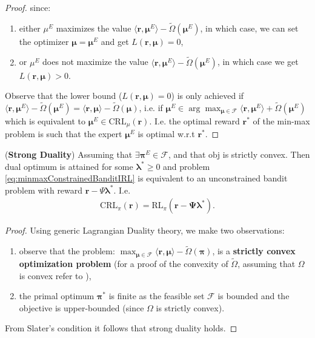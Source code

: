 \begin{proof}
    since:
    \begin{enumerate}
        \item either $\mu^E$ maximizes the value $\langle \bm{r}, \bm{\mu}^E \rangle - \tilde{\Omega}(\bm{\mu}^E)$, in which case, we can set the optimizer $\bm{\mu} = \bm{\mu}^E$ and get $ L(\bm{r},\bm{\mu})=0$,
        \item or  $\mu^E$ does not maximize the value $\langle \bm{r}, \bm{\mu}^E\rangle - \tilde{\Omega}(\bm{\mu}^E)$, in  which case we get $ L(\bm{r},\bm{\mu})>0$.
    \end{enumerate}
    Observe that the lower bound ($ L(\bm{r},\bm{\mu})=0$) is only achieved if $\langle \bm{r}, \bm{\mu}^E\rangle - \tilde{\Omega}(\bm{\mu}^E)= \langle \bm{r}, \bm{\mu} \rangle - \tilde{\Omega}(\bm{\mu})$, i.e. if $\bm{\mu}^E \in \arg \max_{\bm{\mu} \in \mathcal{F}} \langle \bm{r}, \bm{\mu}^E \rangle + \tilde{\Omega}(\bm{\mu}^E)$ which is equivalent to $\bm{\mu}^E \in  \text{CRL}_\mu(\bm{r})$. I.e. the optimal reward $\bm{r}^*$ of the min-max problem is such that the expert $\bm{\mu}^E$ is optimal w.r.t $\bm{r}^*$.
    
\end{proof}

\begin{proposition}
    \label{prop:strong_duality}
    (\textbf{Strong Duality}) Assuming that $\exists \bm{\pi}^E\in\mathcal{F}$, and that $\text{obj}$ is strictly convex. Then dual optimum is attained for some $\bm{\lambda}^* \geq 0$ and problem \ref{eq:minmaxConstrainedBanditIRL} is equivalent to an unconstrained bandit problem with reward $\bm{r}-\Psi \bm{\lambda}^*$. I.e. 
    \begin{align*}
        \text{CRL}_\pi(\bm{r}) = \text{RL}_\pi(\bm{r} - \bm{\Psi} \bm{\lambda}^*).
    \end{align*}
\end{proposition}
\begin{proof}
    Using generic Lagrangian Duality theory, we make two observations:
    \begin{enumerate}
        \item observe that the problem: $\max_{\bm{\mu} \in \mathcal{F}} \langle \bm{r}, \bm{\mu} \rangle - \tilde{\Omega}(\bm{\pi})$, is a \textbf{strictly convex optimization problem} (for a proof of the convexity of $\tilde{\Omega}$, assuming that $\Omega$ is convex refer to \cite{Schlaginhaufen2023}),
        \item the primal optimum $\bm{\pi}^*$ is finite as the feasible set $\mathcal{F}$ is bounded and the objective is upper-bounded (since $\Omega$ is strictly convex).
    \end{enumerate}
    From Slater's condition it follows that strong duality holds.
\end{proof}